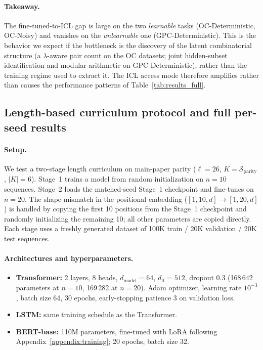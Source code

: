 \documentclass{article} %
\theoremstyle{plain}
\theoremstyle{definition}
\theoremstyle{remark}
\begin{document}
\paragraph{Takeaway.}
The fine-tuned-to-ICL gap is large on the two \emph{learnable} tasks (OC-Deterministic, OC-Noisy) and vanishes on the \emph{unlearnable} one (GPC-Deterministic). This is the behavior we expect if the bottleneck is the discovery of the latent combinatorial structure (a $\lambda$-aware pair count on the OC datasets; joint hidden-subset identification and modular arithmetic on GPC-Deterministic), rather than the training regime used to extract it. The ICL access mode therefore amplifies rather than causes the performance patterns of Table~\ref{tab:results_full}.

\subsection{Length-based curriculum protocol and full per-seed results}
\label{app:parity_curriculum}

\paragraph{Setup.} We test a two-stage length curriculum on main-paper parity ($\ell=26$, $K=\mathcal{S}_{\text{parity}}$, $|K|=6$). Stage~1 trains a model from random initialization on $n=10$ sequences. Stage~2 loads the matched-seed Stage~1 checkpoint and fine-tunes on $n=20$. The shape mismatch in the positional embedding ($[1, 10, d] \to [1, 20, d]$) is handled by copying the first 10 positions from the Stage~1 checkpoint and randomly initializing the remaining 10; all other parameters are copied directly. Each stage uses a freshly generated dataset of 100K train / 20K validation / 20K test sequences.

\paragraph{Architectures and hyperparameters.}
\begin{itemize}
\item \textbf{Transformer:} 2 layers, 8 heads, $d_{\text{model}}=64$, $d_{\text{ff}}=512$, dropout 0.3 (168\,642 parameters at $n=10$, 169\,282 at $n=20$). Adam optimizer, learning rate $10^{-3}$, batch size 64, 30 epochs, early-stopping patience 3 on validation loss.
\item \textbf{LSTM:} same training schedule as the Transformer.
\item \textbf{BERT-base:} 110M parameters, fine-tuned with LoRA following Appendix~\ref{appendix:training}; 20 epochs, batch size 32.
\end{itemize}
\end{document}
